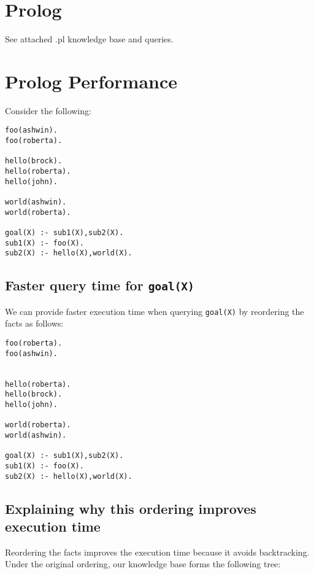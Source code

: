 \documentclass[paper=a4, fontsize=11pt]{scrartcl} %
\numberwithin{equation}{section} %
\numberwithin{figure}{section} %
\numberwithin{table}{section} %
\begin{document}
\FloatBarrier

\section{Prolog}

See attached .pl knowledge base and queries.

\section{Prolog Performance}

Consider the following:

\begin{lstlisting}
foo(ashwin).
foo(roberta).

hello(brock).
hello(roberta).
hello(john).

world(ashwin).
world(roberta).

goal(X) :- sub1(X),sub2(X).
sub1(X) :- foo(X).
sub2(X) :- hello(X),world(X).
\end{lstlisting}

\subsection{Faster query time for \texttt{goal(X)}}

We can provide faster execution time when querying \texttt{goal(X)} by reordering the facts as follows:

\begin{lstlisting}
foo(roberta).
foo(ashwin).


hello(roberta).
hello(brock).
hello(john).

world(roberta).
world(ashwin).

goal(X) :- sub1(X),sub2(X).
sub1(X) :- foo(X).
sub2(X) :- hello(X),world(X).
\end{lstlisting}

\subsection{Explaining why this ordering improves execution time}

Reordering the facts improves the execution time because it avoids backtracking. Under the original ordering, our knowledge base forms the following tree:

\end{document}
